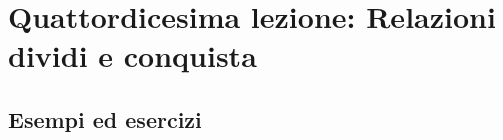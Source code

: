 \section{Quattordicesima lezione: Relazioni dividi e conquista}

\subsection{Esempi ed esercizi}



\newpage
